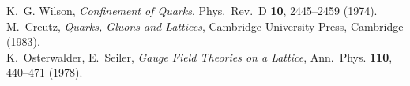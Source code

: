 \begin{thebibliography}{99}
	
	K.~G. Wilson,
	\textit{Confinement of Quarks},
	Phys.~Rev.~D \textbf{10}, 2445--2459 (1974).
	\\[-0.75em]
	
	M.~Creutz,
	\textit{Quarks, Gluons and Lattices},
	Cambridge University Press, Cambridge (1983).
	\\[-0.75em]
	
	K.~Osterwalder, E.~Seiler,
	\textit{Gauge Field Theories on a Lattice},
	Ann.~Phys. \textbf{110}, 440--471 (1978).
	
\end{thebibliography}


